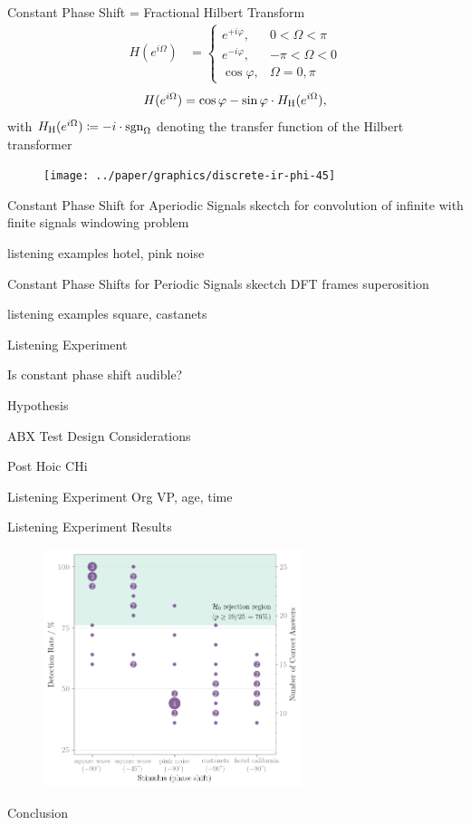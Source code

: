 \documentclass[mathserif]{intbeamer}
\begin{document}
%
%
%
\begin{frame}{Constant Phase Shift = Fractional Hilbert Transform}
\begin{align}
H(e^{i\Omega}) &=
\begin{cases}
e^{+i\varphi}, & 0 < \Omega < \pi\\
e^{-i\varphi}, & -\pi < \Omega < 0\\
\cos\varphi, & \Omega = 0, \pi
\end{cases}
\label{eq:def-dtft}
\end{align}
\begin{align}
H(e^{i\Omega})
= \cos\varphi
- \sin\varphi\cdot H_{\mathrm{H}}(e^{i\Omega}),
\label{eq:decomp-dtft}
\end{align}
with
$H_{\mathrm{H}}(e^{i\Omega})\coloneqq-i\cdot\text{sgn}_{\Omega}$ denoting
the transfer function of the Hilbert transformer
\begin{figure}
\texttt{[image: ../paper/graphics/discrete-ir-phi-45]}
\end{figure}
\end{frame}
%
%
%
\begin{frame}{Constant Phase Shift for Aperiodic Signals}
skectch for convolution of infinite with finite signals
windowing problem

listening examples hotel, pink noise

\end{frame}
%
%
%
\begin{frame}{Constant Phase Shifts for Periodic Signals}
skectch DFT frames superosition

listening examples square, castanets

\end{frame}
%
%
%
\begin{frame}{Listening Experiment}

Is constant phase shift audible?


Hypothesis

ABX Test Design Considerations

Post Hoic CHi

\end{frame}
%
%
%
\begin{frame}{Listening Experiment Org}
VP, age, time

\end{frame}
%
%
%
\begin{frame}{Listening Experiment Results}
\begin{figure}
\includegraphics[width=0.67\textwidth]{../paper/graphics/scatter}
\end{figure}
\end{frame}
%
%
%
\begin{frame}{Conclusion}
\end{frame}
%
%
%
\end{document}
